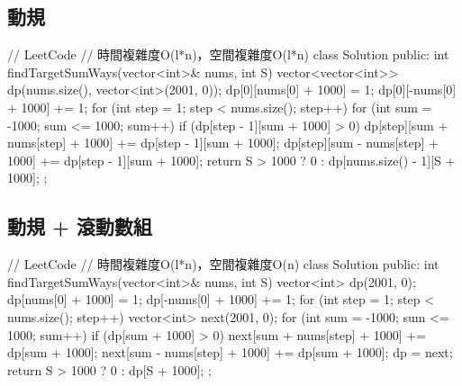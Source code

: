 \subsection{動規}
\begin{Code}
// LeetCode
// 時間複雜度O(l*n)，空間複雜度O(l*n)
class Solution {
public:
    int findTargetSumWays(vector<int>& nums, int S) {
        vector<vector<int>> dp(nums.size(), vector<int>(2001, 0));
        dp[0][nums[0] + 1000] = 1;
        dp[0][-nums[0] + 1000] += 1;
        for (int step = 1; step < nums.size(); step++)
        {
            for (int sum = -1000; sum <= 1000; sum++)
            {
                if (dp[step - 1][sum + 1000] > 0)
                {
                    dp[step][sum + nums[step] + 1000] += dp[step - 1][sum + 1000];
                    dp[step][sum - nums[step] + 1000] += dp[step - 1][sum + 1000];
                }
            }
        }
        return S > 1000 ? 0 : dp[nums.size() - 1][S + 1000];
    }
};
\end{Code}

\subsection{動規 + 滾動數組}
\begin{Code}
// LeetCode
// 時間複雜度O(l*n)，空間複雜度O(n)
class Solution {
public:
    int findTargetSumWays(vector<int>& nums, int S) {
        vector<int> dp(2001, 0);
        dp[nums[0] + 1000] = 1;
        dp[-nums[0] + 1000] += 1;
        for (int step = 1; step < nums.size(); step++)
        {
            vector<int> next(2001, 0);
            for (int sum = -1000; sum <= 1000; sum++)
            {
                if (dp[sum + 1000] > 0)
                {
                    next[sum + nums[step] + 1000] += dp[sum + 1000];
                    next[sum - nums[step] + 1000] += dp[sum + 1000];
                }
            }
            dp = next;
        }
        return S > 1000 ? 0 : dp[S + 1000];
    }
};
\end{Code}
